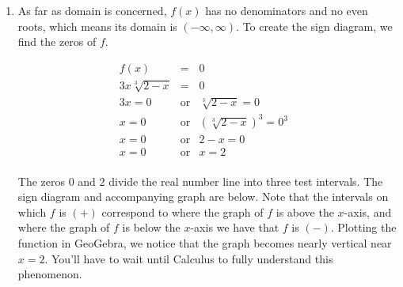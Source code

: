 {
\begin{enumerate}

\item  As far as domain is concerned, $f(x)$ has no denominators and no even roots, which means its domain is $(-\infty, \infty)$.  To create the sign diagram, we find the zeros of $f$.  

\[ \begin{array}{rclr}

f(x) & = & 0 & \\

3x \sqrt[3]{2-x} & = & 0 \\

3x = 0 & \mbox{or} & \sqrt[3]{2-x} = 0 & \\

x = 0 & \mbox{or} & \left(\sqrt[3]{2-x}\right)^3 = 0^3 & \\

x = 0 & \mbox{or} & 2-x = 0 & \\

x = 0 & \mbox{or} & x=2 & \\

\end{array}\]

The zeros $0$ and $2$ divide the real number line into three test intervals.  The sign diagram and accompanying graph are below.  Note that the intervals on which $f$ is $(+)$ correspond to where the graph of $f$ is above the $x$-axis, and where the graph of $f$ is below the $x$-axis we have that $f$ is $(-)$.  Plotting the function in GeoGebra, we notice that the graph becomes nearly vertical near $x=2$.  You'll have to wait until Calculus to fully understand this phenomenon.



\end{enumerate}}
